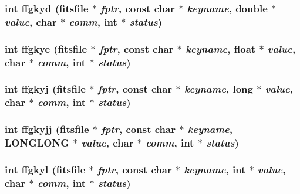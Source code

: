 \subsubsection{\setlength{\rightskip}{0pt plus 5cm}int ffgkyd (\bf{fitsfile} $\ast$ {\em fptr}, const char $\ast$ {\em keyname}, double $\ast$ {\em value}, char $\ast$ {\em comm}, int $\ast$ {\em status})}\label{test_2shm__client_2fitsio_8h_7f11b595f4dd81df24a8e0f95198e9d0}


\subsubsection{\setlength{\rightskip}{0pt plus 5cm}int ffgkye (\bf{fitsfile} $\ast$ {\em fptr}, const char $\ast$ {\em keyname}, float $\ast$ {\em value}, char $\ast$ {\em comm}, int $\ast$ {\em status})}\label{test_2shm__client_2fitsio_8h_765b39f911a7fa630490fcc7c22b7da7}


\subsubsection{\setlength{\rightskip}{0pt plus 5cm}int ffgkyj (\bf{fitsfile} $\ast$ {\em fptr}, const char $\ast$ {\em keyname}, long $\ast$ {\em value}, char $\ast$ {\em comm}, int $\ast$ {\em status})}\label{test_2shm__client_2fitsio_8h_390adabb4fae20ebb831ef865b10cab7}


\subsubsection{\setlength{\rightskip}{0pt plus 5cm}int ffgkyjj (\bf{fitsfile} $\ast$ {\em fptr}, const char $\ast$ {\em keyname}, \bf{LONGLONG} $\ast$ {\em value}, char $\ast$ {\em comm}, int $\ast$ {\em status})}\label{test_2shm__client_2fitsio_8h_6ad49eda5b9e0d9b57def9abc3f60fe5}


\subsubsection{\setlength{\rightskip}{0pt plus 5cm}int ffgkyl (\bf{fitsfile} $\ast$ {\em fptr}, const char $\ast$ {\em keyname}, int $\ast$ {\em value}, char $\ast$ {\em comm}, int $\ast$ {\em status})}\label{test_2shm__client_2fitsio_8h_514f9731bc6c8ba190dccd5d4744f841}


